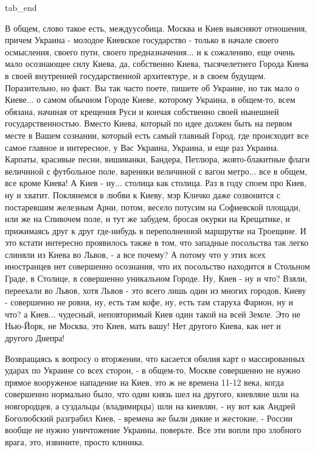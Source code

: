   tab_end
\fi

В общем, слово такое есть, междуусобица.  Москва и Киев выясняют отношения,
причем Украина - молодое Киевское государство - только в начале своего
осмысления, своего пути, своего предназначения... и к сожалению, еще очень мало
осознающее силу Киева, да, собственно Киева, тысячелетнего Города Киева в своей
внутренней государственной архитектуре, и в своем будущем. Поразительно, но
факт. Вы так часто поете, пишете об Украине, но так мало о Киеве... о самом
обычном Городе Киеве, которому Украина, в общем-то, всем обязана, начиная от
крещения Руси и кончая собственно своей нынешней государственностью. Вместо
Киева, который по идее должен быть на первом месте в Вашем сознании, который
есть самый главный Город, где происходит все самое главное и интересное, у Вас
Украина, Украина, и еще раз Украина. Карпаты, красивые песни, вишиванки,
Бандера, Петлюра, жовто-блакитные флаги величиной с футбольное поле, вареники
величиной с вагон метро... все в общем, все кроме Киева!  А Киев - ну...
столица как столица. Раз в году споем про Киев, ну и хватит. Поклянемся в любви
к Киеву, мэр Кличко даже созвонится с постаревшим железным Арни, потом, весело
потусим на Софиевской площади, или же на Спивочем поле, и тут же забудем,
бросая окурки на Крещатике, и прижимаясь друг к друг где-нибудь в переполненной
маршрутке на Троещине. И это кстати интересно проявилось также в том, что
западные посольства так легко слиняли из Киева во Львов, -  а все почему? А
потому что у этих всех иностранцев нет совершенно осознания, что их посольство
находится в Стольном Граде, в Столице, в совершенно уникальном Городе. Ну, Киев
- ну и что?  Взяли, переехали во Львов, хотя Львов - это всего лишь один из
многих городов, Киеву - совершенно не ровня, ну, есть там кофе, ну, есть там
старуха Фарион, ну и что? а Киев... чудесный, неповторимый Киев один такой на
всей Земле. Это не Нью-Йорк, не Москва, это Киев, мать вашу!  Нет другого
Киева, как нет и другого Днепра!

Возвращаясь к вопросу о вторжении, что касается обилия карт о массированных
ударах по Украине со всех сторон, -  в общем-то, Москве совершенно не нужно
прямое вооруженое нападение на Киев, это ж не времена 11-12 века, когда
совершенно нормально было, что один князь шел на другого, киевляне шли на
новгородцев, а суздальцы (владимирцы) шли на киевлян, - ну вот как Андрей
Боголюбский разграбил Киев, - времена же были дикие и жестокие, - России вообще
не нужно уничтожение Украины, поверьте. Все эти вопли про злобного врага, это,
извините, просто клиника. 

